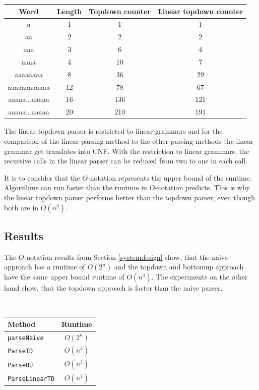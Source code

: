 \documentclass[a4paper, 11pt]{article}
\begin{document}
\begin{center}
\begin{tabular}{|c|c||c|c|}
\hline
Word & Length & Topdown counter & Linear topdown counter \\
\hline
\hline
a & 1 & 1 & 1 \\
\hline
aa & 2 & 2 & 2 \\
\hline
aaa & 3 & 6 & 4  \\
\hline
aaaa & 4 &  10  & 7  \\
\hline
aaaaaaaa & 8 & 36  & 29 \\
\hline
aaaaaaaaaaaa & 12 & 78 &  67  \\
\hline
aaaaa...aaaaa & 16 & 136 & 121  \\
\hline
aaaaa...aaaaa & 20 & 210 &191 \\
\hline
\end{tabular}
\end{center}


The linear topdown parser is restricted to linear grammars and for the comparison of the linear parsing method to the other parsing methods the linear grammar get translates into CNF. With the restriction to linear grammars, the recursive calls in the linear parser can be reduced from two to one in each call.

It is to consider that the $O$-notation represents the upper bound of the runtime. Algorithms can run faster than the runtime in $O$-notation predicts. This is why the linear topdown parser performs better than the topdown parser, even though both are in $O(n^3)$.

    
 



\subsection{Results}
\label{results}

\begin{minipage}{0.5\textwidth}
The $O$-notation results from Section \ref{systemdesign} show, that the naive approach has a runtime of $O(2^n)$ and the topdown and bottomup approach have the same upper bound runtime of $O(n^3)$.
The experiments on the other hand show, that the topdown approach is faster than the naive parser.
\end{minipage}
\begin{minipage}{0.1\textwidth} \ \end{minipage}
\begin{minipage}{0.3\textwidth}
\begin{tabular}{|l|c|}
\hline
Method & Runtime \\
\hline
\texttt{parseNaive} & $O(2^n)$\\
\texttt{ParseTD} & $O(n^3)$ \\
\texttt{ParseBU} & $O(n^3)$\\
\texttt{ParseLinearTD} & $O(n^3)$\\
\hline
\end{tabular}
\end{minipage}
\end{document}
